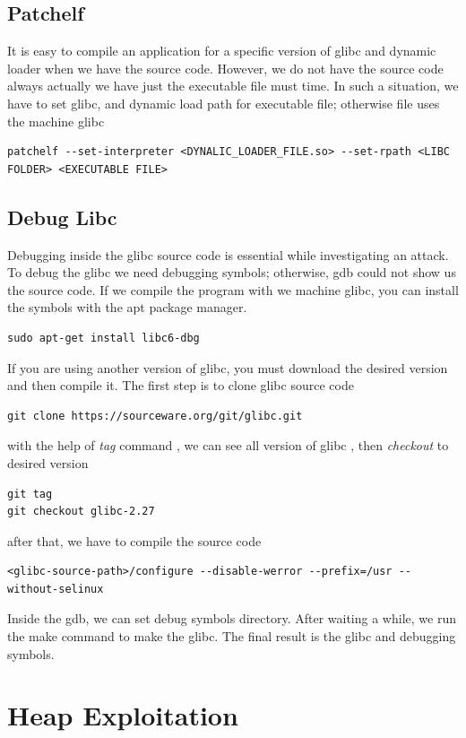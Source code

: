 \documentclass{masterthesis}
\newcommand*\libc{glibc}
\begin{document}
\section{Patchelf}
It is easy to compile an application for a specific version of \libc{} and dynamic loader when we have the source code. However, we do not have the source code always actually we have just the executable file must time. In such a situation, we have to set \libc{}, and dynamic load path for executable file; otherwise file uses the machine \libc{}
\begin{lstlisting}[frame=tlrb]
patchelf --set-interpreter <DYNALIC_LOADER_FILE.so> --set-rpath <LIBC FOLDER> <EXECUTABLE FILE>
\end{lstlisting}

\section{Debug Libc}

Debugging inside the \libc{} source code is essential while investigating an attack. To debug the \libc{} we need debugging symbols; otherwise, gdb could not show us the source code. If we compile the program with we machine \libc{}, you can install the symbols with the apt package manager.
\begin{lstlisting}[frame=tlrb]
sudo apt-get install libc6-dbg
\end{lstlisting}

If you are using another version of \libc{}, you must download the desired version and then compile it. The first step is to clone \libc{} source code
\begin{lstlisting}[frame=tlrb]
git clone https://sourceware.org/git/glibc.git
\end{lstlisting}
with the help of \emph{tag} command , we can see all version of \libc{} , then \emph{checkout} to desired version
\begin{lstlisting}[frame=tlrb]
git tag
git checkout glibc-2.27
\end{lstlisting}
after that, we have to compile the source code
\begin{lstlisting}[frame=tlrb]
<glibc-source-path>/configure --disable-werror --prefix=/usr --without-selinux
\end{lstlisting}
Inside the gdb, we can set debug symbols directory. After waiting a while, we run the make command to make the \libc{}. The final result is the \libc{} and debugging symbols.

\chapter{Heap Exploitation }
\end{document}
